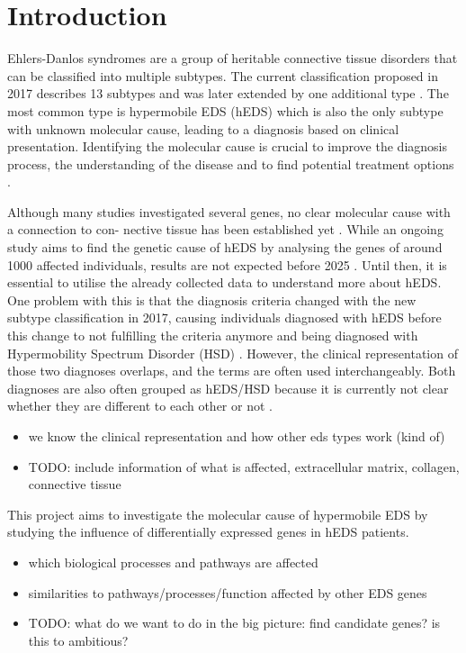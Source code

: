 \section{Introduction}


Ehlers-Danlos syndromes are a group of heritable connective tissue disorders that can be classified into multiple subtypes. The current classification proposed in 2017 describes 13 subtypes \cite{classification2017} and was later extended by one additional type \cite{Malfait2020}. The most common type is hypermobile EDS (hEDS) which is also the only subtype with unknown molecular cause, leading to a diagnosis based on clinical presentation. Identifying the molecular cause is crucial to improve the diagnosis process, the understanding of the disease and to find potential treatment options \cite{Ritelli2020}.

Although many studies investigated several genes, no clear molecular cause with a connection to con- nective tissue has been established yet \cite{Caliogna2021}. While an ongoing study aims to find the genetic cause of hEDS by analysing the genes of around 1000 affected individuals, results are not expected before 2025 \cite{HEDGE}. Until then, it is essential to utilise the already collected data to understand more about hEDS. One problem with this is that the diagnosis criteria changed with the new subtype classification in 2017, causing individuals diagnosed with hEDS before this change to not fulfilling the criteria anymore and being diagnosed with Hypermobility Spectrum Disorder (HSD) \cite{Gensemer2021}. However, the clinical representation of those two diagnoses overlaps, and the terms are often used interchangeably. Both diagnoses are also often grouped as hEDS/HSD because it is currently not clear whether they are different to each other or not \cite{Gensemer2021,Ritelli2022}.


\begin{itemize}
	\item we know the clinical representation and how other eds types work (kind of)
	\item TODO: include information of what is affected, extracellular matrix, collagen, connective tissue
\end{itemize}

This project aims to investigate the molecular cause of hypermobile EDS by studying the influence of differentially expressed genes in hEDS patients.
\begin{itemize}
	\item which biological processes and pathways are affected
	\item similarities to pathways/processes/function affected by other EDS genes
	\item TODO: what do we want to do in the big picture: find candidate genes? is this to ambitious?
\end{itemize}